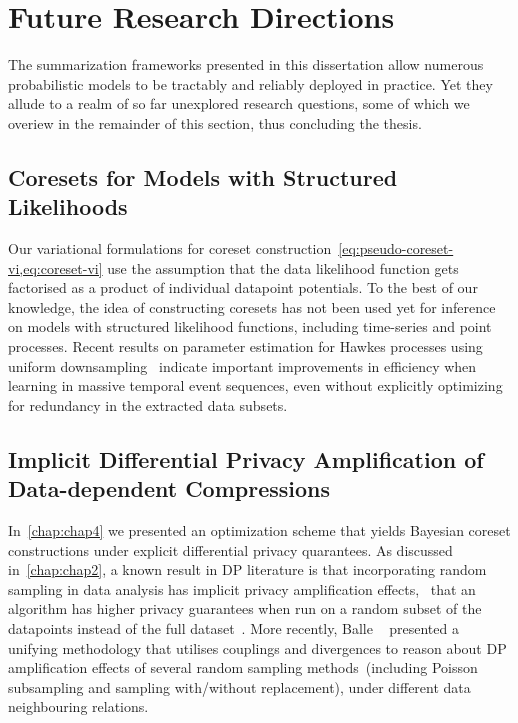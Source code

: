 \section{Future Research Directions}
\label{sec:future-research-directions}
The summarization frameworks presented in this dissertation allow numerous probabilistic models to be tractably and reliably deployed in practice. Yet they allude to a realm of so far unexplored research questions, some of which we overiew in the remainder of this section, thus concluding the thesis.

\subsection{Coresets for Models with Structured Likelihoods}
\label{subsec:structure-liks}

Our variational formulations for coreset construction~\cref{eq:pseudo-coreset-vi,eq:coreset-vi} use the assumption that the data likelihood function gets factorised as a product of individual datapoint potentials. To the best of our knowledge, the idea of constructing coresets has not been used yet for inference on models with structured likelihood functions, including time-series and point processes. Recent results on parameter estimation for Hawkes processes using uniform downsampling~\citep{li19} indicate important improvements in efficiency when learning in massive temporal event sequences, even without explicitly optimizing for redundancy in the extracted data subsets.

\subsection{Implicit Differential Privacy Amplification of Data-dependent Compressions}
\label{subsec:implicit-dp-amplification}

In~\cref{chap:chap4} we presented an optimization scheme that yields Bayesian coreset constructions under explicit differential privacy quarantees. As discussed in~\cref{chap:chap2}, a known result in DP literature is that incorporating random sampling in data analysis has implicit privacy amplification effects, \ie~that an algorithm has higher privacy guarantees when run on a random subset of the datapoints instead of the full dataset~\citep{li12, beimel13, bassily14, abadi16}. More recently, Balle \etal~\citep{balle18} presented a unifying methodology that utilises couplings and divergences to reason about DP amplification effects of several random sampling methods~(including Poisson subsampling and sampling with/without replacement), under different data neighbouring relations.

